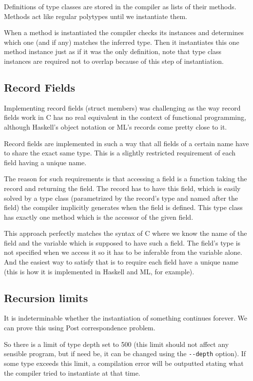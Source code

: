Definitions of type classes are stored in the compiler as lists of their methods. Methods act like regular polytypes until we instantiate them.

When a method is instantiated the compiler checks its instances and determines which one (and if any) matches the inferred type. Then it instantiates this one method instance just as if it was the only definition, note that type class instances are required not to overlap because of this step of instantiation.

\subsection{Record Fields}
\label{ssec:recordFieldsCHM}

Implementing record fields (struct members) was challenging as the way record fields work in C has no real equivalent in the context of functional programming, although Haskell's object notation or ML's records come pretty close to it.

Record fields are implemented in such a way that all fields of a certain name have to share the exact same type. This is a slightly restricted requirement of each field having a unique name.

The reason for such requirements is that accessing a field is a function taking the record and returning the field. The record has to have this field, which is easily solved by a type class (parametrized by the record's type and named after the field) the compiler implicitly generates when the field is defined. This type class has exactly one method which is the accessor of the given field.

This approach perfectly matches the syntax of C where we know the name of the field and the variable which is supposed to have such a field. The field's type is not specified when we access it so it has to be inferable from the variable alone. And the easiest way to satisfy that is to require each field have a unique name (this is how it is implemented in Haskell and ML, for example).

\subsection{Recursion limits}

It is indeterminable whether the instantiation of something continues forever. We can prove this using Post correspondence problem. %

So there is a limit of type depth set to 500 (this limit should not affect any sensible program, but if need be, it can be changed using the \lstinline[language=sh]{--depth} option). If some type exceeds this limit, a compilation error will be outputted stating what the compiler tried to instantiate at that time.

